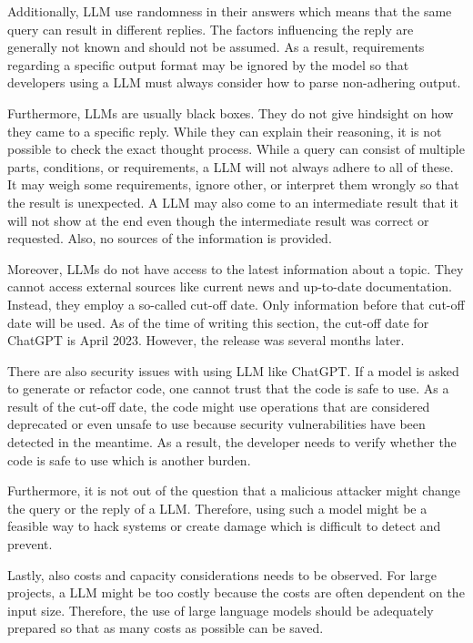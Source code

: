 Additionally, \ac{LLM} use randomness in their answers which means that the same query can result in different replies. The factors influencing the reply are generally not known and should not be assumed. As a result, requirements regarding a specific output format may be ignored by the model so that developers using a \ac{LLM} must always consider how to parse non-adhering output.  \cite{hu2023large}

Furthermore, \ac{LLM}s are usually black boxes. They do not give hindsight on how they came to a specific reply. While they can explain their reasoning, it is not possible to check the exact thought process.
While a query can consist of multiple parts, conditions, or requirements, a \ac{LLM} will not always adhere to all of these. It may weigh some requirements, ignore other, or interpret them wrongly so that the result is unexpected. A \ac{LLM} may also come to an intermediate result that it will not show at the end even though the intermediate result was correct or requested. Also, no sources of the information is provided. \cite{chen2023instructzero}

Moreover, \ac{LLM}s do not have access to the latest information about a topic. They cannot access external sources like current news and up-to-date documentation. Instead, they employ a so-called cut-off date. Only information before that cut-off date will be used. As of the time of writing this section, the cut-off date for ChatGPT is April  2023. However, the release was several months later.  

There are also security issues with using  \ac{LLM} like ChatGPT. If a model is asked to generate or refactor code, one cannot trust that the code is safe to use. As a result of the cut-off date, the code might use operations that are considered deprecated or even unsafe to use because security vulnerabilities have been detected in the meantime. As a result, the developer needs to verify whether the code is safe to use which is another burden.  \cite{pearce2021asleep}

Furthermore, it is not out of the question that a malicious attacker might change the query or the reply of a \ac{LLM}. Therefore, using such a model might be a feasible way to hack systems or create damage which is difficult to detect and prevent. \cite{not_what_you_signed_for}

Lastly, also costs and capacity considerations needs to be observed. For large projects, a \ac{LLM} might be too costly because  the costs are often dependent on the input size. Therefore, the use of large language models should be adequately prepared so that as many costs as possible can be saved.  \cite{chen2023frugalgpt}



